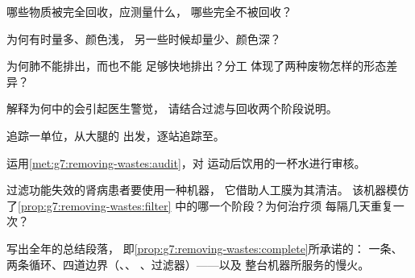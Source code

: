 \begin{exercise}[$\star$]\label{exo:g7:removing-wastes:5}
哪些物质被完全回收，应测量什么，
哪些完全不被回收？
\end{exercise}

\begin{exercise}[$\star$]\label{exo:g7:removing-wastes:6}
为何有时量多、颜色浅，
另一些时候却量少、颜色深？
\end{exercise}

\begin{exercise}[$\star\star$]\label{exo:g7:removing-wastes:7}
为何肺不能排出，而也不能
足够快地排出？分工
体现了两种废物怎样的形态差异？
\end{exercise}

\begin{exercise}[$\star\star$]\label{exo:g7:removing-wastes:8}
解释为何中的会引起医生警觉，
请结合过滤与回收两个阶段说明。
\end{exercise}

\begin{exercise}[$\star\star$]\label{exo:g7:removing-wastes:9}
追踪一单位，从大腿的
出发，逐站追踪至。
\end{exercise}

\begin{exercise}[$\star\star$]\label{exo:g7:removing-wastes:10}
运用\cref{met:g7:removing-wastes:audit}，对
运动后饮用的一杯水进行审核。
\end{exercise}

\begin{exercise}[$\star\star$]\label{exo:g7:removing-wastes:11}
过滤功能失效的肾病患者要使用一种机器，
它借助人工膜为其清洁。
该机器模仿了\cref{prop:g7:removing-wastes:filter}
中的哪一个阶段？为何治疗须
每隔几天重复一次？
\end{exercise}

\begin{exercise}[$\star\star\star$]\label{exo:g7:removing-wastes:12}
写出全年的总结段落，
即\cref{prop:g7:removing-wastes:complete}所承诺的：
一条、两条循环、四道边界（、、
、过滤器）——以及
整台机器所服务的慢火。
\end{exercise}

